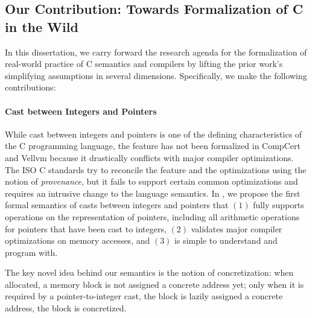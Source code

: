 



\subsection{Our Contribution: Towards Formalization of C in the Wild}

In this dissertation, we carry forward the research agenda for the formalization of real-world
practice of C semantics and compilers by lifting the prior work's simplifying assumptions in several
dimensions.  Specifically, we make the following contributions:



%
\paragraph{Cast between Integers and Pointers}

While cast between integers and pointers is one of the defining characteristics of the C programming
language, the feature has not been formalized in CompCert and Vellvm because it drastically
conflicts with major compiler optimizations.  The ISO C standards try to reconcile the feature and
the optimizations using the notion of \emph{provenance}, but it fails to support certain common
optimizations and requires an intrusive change to the language semantics.  In
, we propose the first formal semantics of casts between integers and pointers
that $(1)$ fully supports operations on the representation of pointers, including all arithmetic
operations for pointers that have been cast to integers, $(2)$ validates major compiler
optimizations on memory accesses, and $(3)$ is simple to understand and program with.

The key novel idea behind our semantics is the notion of concretization: when allocated, a memory
block is not assigned a concrete address yet; only when it is required by a pointer-to-integer cast,
the block is lazily assigned a concrete address, \ie{} the block is concretized.

